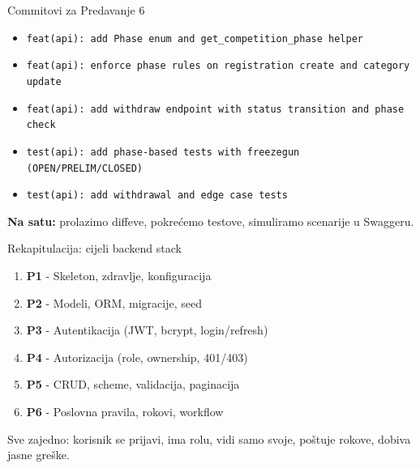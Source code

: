 \begin{frame}{Commitovi za Predavanje 6}
\begin{itemize}
  \item \texttt{feat(api): add Phase enum and get\_competition\_phase helper}
  \item \texttt{feat(api): enforce phase rules on registration create and category update}
  \item \texttt{feat(api): add withdraw endpoint with status transition and phase check}
  \item \texttt{test(api): add phase-based tests with freezegun (OPEN/PRELIM/CLOSED)}
  \item \texttt{test(api): add withdrawal and edge case tests}
\end{itemize}

\vspace{0.4em}
\textbf{Na satu:} prolazimo diffeve, pokrećemo testove, simuliramo scenarije u Swaggeru.
\end{frame}

\begin{frame}{Rekapitulacija: cijeli backend stack}
\begin{enumerate}
  \item \textbf{P1} - Skeleton, zdravlje, konfiguracija
  \item \textbf{P2} - Modeli, ORM, migracije, seed
  \item \textbf{P3} - Autentikacija (JWT, bcrypt, login/refresh)
  \item \textbf{P4} - Autorizacija (role, ownership, 401/403)
  \item \textbf{P5} - CRUD, scheme, validacija, paginacija
  \item \textbf{P6} - Poslovna pravila, rokovi, workflow
\end{enumerate}

\vspace{0.6em}
Sve zajedno: korisnik se prijavi, ima rolu, vidi samo svoje, poštuje rokove, dobiva jasne greške.
\end{frame}

